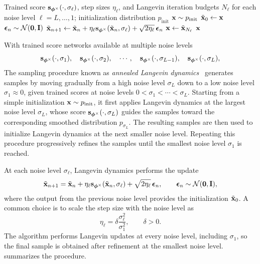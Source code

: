 \begin{algorithm}[th]
\caption{\label{alg:smld} Annealed Langevin Dynamics}
\begin{algorithmic}[1]
\Require Trained score ${\mathbf{s}}_{\bm{\phi}^\times}(\cdot,\sigma_\ell)$,
step sizes $\eta_\ell$, and Langevin iteration budgets $N_\ell$
for each noise level $\ell=L,\ldots,1$; initialization distribution
$p_{\mathrm{init}}$
\State ${\mathbf{x}} \sim p_{\mathrm{init}}$
\Statex{}
    \State $\tilde{{\mathbf{x}}}_0 \gets {\mathbf{x}}$
    \Statex{}
        \State $\bm{\epsilon}_n \sim \mathcal{N}(\bm{0},{\mathbf{I}})$
        \State $\tilde{{\mathbf{x}}}_{n+1}
        \gets
        \tilde{{\mathbf{x}}}_n
        +\eta_\ell
        {\mathbf{s}}_{\bm{\phi}^\times}(\tilde{{\mathbf{x}}}_n,\sigma_\ell)
        +\sqrt{2\eta_\ell}\,\bm{\epsilon}_n$
    \EndFor
    \State ${\mathbf{x}} \gets \tilde{{\mathbf{x}}}_{N_\ell}$
    \Statex{}
\EndFor
\Ensure ${\mathbf{x}}$
\end{algorithmic}
\end{algorithm}


With trained score networks available at multiple noise levels
\[
{\mathbf{s}}_{\bm{\phi}^\times}(\cdot, \sigma_1), \quad{\mathbf{s}}_{\bm{\phi}^\times}(\cdot, \sigma_2), \quad \cdots, \quad {\mathbf{s}}_{\bm{\phi}^\times}(\cdot, \sigma_{L-1}), \quad    {\mathbf{s}}_{\bm{\phi}^\times}(\cdot, \sigma_L),
\]
The sampling procedure known as \emph{annealed Langevin dynamics}~\citep{song2019generative} generates samples by moving gradually from a high noise level $\sigma_L$ down to a low noise level $\sigma_1 \approx 0$, given trained scores at noise levels
$0<\sigma_1<\cdots<\sigma_L$.
Starting from a simple initialization
${\mathbf{x}}\sim p_{\mathrm{init}}$, it first applies Langevin dynamics at the largest
noise level $\sigma_L$, whose score
${\mathbf{s}}_{\bm{\phi}^\times}(\cdot,\sigma_L)$ guides the samples toward the
corresponding smoothed distribution $p_{\sigma_L}$.
The resulting samples are then used to initialize Langevin dynamics at the next
smaller noise level. Repeating this procedure progressively refines the samples
until the smallest noise level $\sigma_1$ is reached.

At each noise level $\sigma_\ell$, Langevin dynamics performs the update
\[
\tilde{{\mathbf{x}}}_{n+1}
=
\tilde{{\mathbf{x}}}_n
+
\eta_\ell
{\mathbf{s}}_{\bm{\phi}^\times}(\tilde{{\mathbf{x}}}_n,\sigma_\ell)
+
\sqrt{2\eta_\ell}\,\bm{\epsilon}_n,
\qquad
\bm{\epsilon}_n\sim\mathcal{N}(\bm{0},{\mathbf{I}}),
\]
where the output from the previous noise level provides the initialization
$\tilde{{\mathbf{x}}}_0$.
A common choice is to scale the step size with the noise level as
\[
\eta_\ell
=
\delta\frac{\sigma_\ell^2}{\sigma_1^2},
\qquad
\delta>0.
\]
The algorithm performs Langevin updates at every noise level, including
$\sigma_1$, so the final sample is obtained after refinement at the smallest
noise level.  summarizes the procedure.

